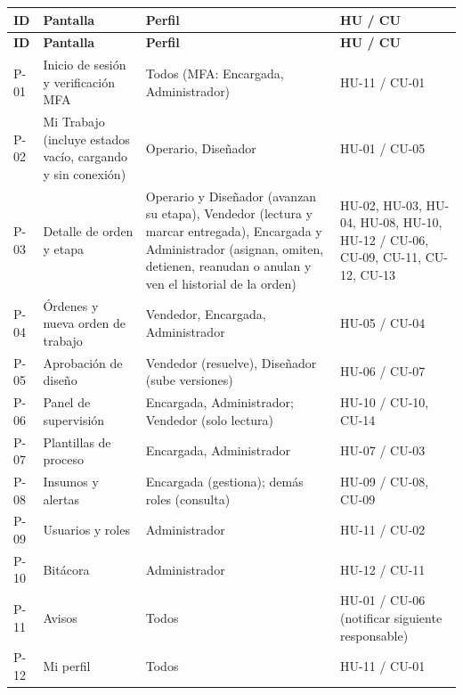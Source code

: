 \documentclass[11pt,a4paper]{article}
\begin{document}
\begingroup\small
\begin{longtable}{@{}>{\raggedright\arraybackslash\hspace{0pt}}p{}>{\raggedright\arraybackslash\hspace{0pt}}p{}>{\raggedright\arraybackslash\hspace{0pt}}p{}>{\raggedright\arraybackslash\hspace{0pt}}p{}@{}}
\toprule
\textbf{ID} & \textbf{Pantalla} & \textbf{Perfil} & \textbf{HU / CU} \\ \midrule
\endfirsthead
\toprule
\textbf{ID} & \textbf{Pantalla} & \textbf{Perfil} & \textbf{HU / CU} \\ \midrule
\endhead
\bottomrule
\endlastfoot
\mbox{P-01} & Inicio de sesión y verificación MFA & Todos (MFA: Encargada, Administrador) & \mbox{HU-11} / \mbox{CU-01} \\ \addlinespace[0.25em]
\mbox{P-02} & Mi Trabajo (incluye estados vacío, cargando y sin conexión) & Operario, Diseñador & \mbox{HU-01} / \mbox{CU-05} \\ \addlinespace[0.25em]
\mbox{P-03} & Detalle de orden y etapa & Operario y Diseñador (avanzan su etapa), Vendedor (lectura y marcar entregada), Encargada y Administrador (asignan, omiten, detienen, reanudan o anulan y ven el historial de la orden) & \mbox{HU-02}, \mbox{HU-03}, \mbox{HU-04}, \mbox{HU-08}, \mbox{HU-10}, \mbox{HU-12} / \mbox{CU-06}, \mbox{CU-09}, \mbox{CU-11}, \mbox{CU-12}, \mbox{CU-13} \\ \addlinespace[0.25em]
\mbox{P-04} & Órdenes y nueva orden de trabajo & Vendedor, Encargada, Administrador & \mbox{HU-05} / \mbox{CU-04} \\ \addlinespace[0.25em]
\mbox{P-05} & Aprobación de diseño & Vendedor (resuelve), Diseñador (sube versiones) & \mbox{HU-06} / \mbox{CU-07} \\ \addlinespace[0.25em]
\mbox{P-06} & Panel de supervisión & Encargada, Administrador; Vendedor (solo lectura) & \mbox{HU-10} / \mbox{CU-10}, \mbox{CU-14} \\ \addlinespace[0.25em]
\mbox{P-07} & Plantillas de proceso & Encargada, Administrador & \mbox{HU-07} / \mbox{CU-03} \\ \addlinespace[0.25em]
\mbox{P-08} & Insumos y alertas & Encargada (gestiona); demás roles (consulta) & \mbox{HU-09} / \mbox{CU-08}, \mbox{CU-09} \\ \addlinespace[0.25em]
\mbox{P-09} & Usuarios y roles & Administrador & \mbox{HU-11} / \mbox{CU-02} \\ \addlinespace[0.25em]
\mbox{P-10} & Bitácora & Administrador & \mbox{HU-12} / \mbox{CU-11} \\ \addlinespace[0.25em]
\mbox{P-11} & \mbox{Avisos} & \mbox{Todos} & \mbox{HU-01} / \mbox{CU-06} (notificar siguiente responsable) \\ \addlinespace[0.25em]
\mbox{P-12} & Mi perfil & \mbox{Todos} & \mbox{HU-11} / \mbox{CU-01} \\
\end{longtable}
\endgroup
\end{document}
